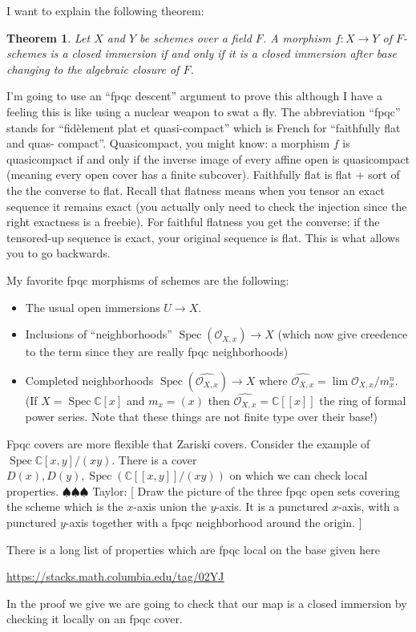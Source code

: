 \documentclass[12pt]{article}
\numberwithin{equation}{section}
\newtheorem{theorem}{Theorem}[subsection]
\theoremstyle{definition}
\theoremstyle{remark}
\newcommand{\CC}{\mathbb{C}}
\newcommand{\Ocal}{\mathcal{O}}
\newcommand{\Spec}{\operatorname{Spec}}
\newcommand{\taylor}[1]{{\color{blue} \sf $\spadesuit\spadesuit\spadesuit$ Taylor: [#1]}}
\begin{document}
I want to explain the following theorem:
\begin{theorem}
	Let $X$ and $Y$ be schemes over a field $F$.
	A morphism $f:X\to Y$ of $F$-schemes is a closed immersion if and only if it is a closed immersion after base changing to the algebraic closure of $F$.
\end{theorem}
I'm going to use an ``fpqc descent'' argument to prove this although I have a feeling this is like using a nuclear weapon to swat a fly.
The abbreviation ``fpqc'' stands for ``fidèlement plat et quasi-compact'' which is French for ``faithfully flat and quas- compact''. 
Quasicompact, you might know: a morphism $f$ is quasicompact if and only if the inverse image of every affine open is quasicompact (meaning every open cover has a finite subcover). 
Faithfully flat is flat + sort of the the converse to flat. 
Recall that flatness means when you tensor an exact sequence it remains exact (you actually only need to check the injection since the right exactness is a freebie). 
For faithful flatness you get the converse: if the tensored-up sequence is exact, your original sequence is flat. 
This is what allows you to go backwards.

My favorite fpqc morphisms of schemes are the following:
\begin{itemize}
	\item The usual open immersions $U\to X$.
	\item Inclusions of ``neighborhoods'' $\Spec(\Ocal_{X,x}) \to X$ (which now give creedence to the term since they are really fpqc neighborhoods)
	\item Completed neighborhoods $\Spec( \widehat{\Ocal_{X,x}}) \to X$ where $\widehat{\Ocal_{X,x}}= \lim \Ocal_{X,x}/m_x^n$. (If $X = \Spec \CC[x]$ and $m_x = (x)$ then $\widehat{\Ocal_{X,x}} = \CC[[x]]$ the ring of formal power series. Note that these things are not finite type over their base!)
\end{itemize}
Fpqc covers are more flexible that Zariski covers. 
Consider the example of $\Spec \CC[x,y]/(xy)$.
There is a cover $D(x), D(y), \Spec(\CC[[x,y]]/(xy))$ on which we can check local properties.
\taylor{ 
Draw the picture of the three fpqc open sets covering the scheme which is the $x$-axis union the $y$-axis.
It is a punctured $x$-axis, with a punctured $y$-axis together with a fpqc neighborhood around the origin.
}

There is a long list of properties which are fpqc local on the base given here
\begin{center}
	\url{https://stacks.math.columbia.edu/tag/02YJ}
\end{center}
In the proof we give we are going to check that our map is a closed immersion by checking it locally on an fpqc cover.
\end{document}
